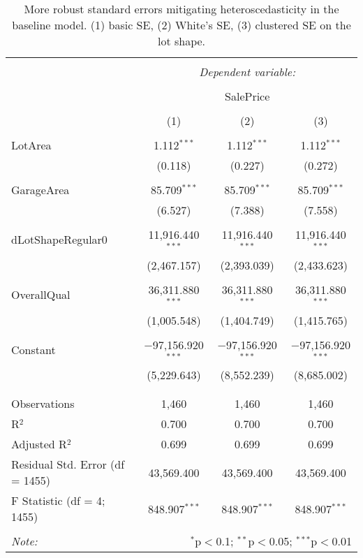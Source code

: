 \documentclass{article}
\begin{document}
\begin{table}[h]
\centering
\caption{\label{tab:standarderrors} More robust standard errors mitigating heteroscedasticity in the baseline model. (1) basic SE, (2) White's SE, (3) clustered SE on the lot shape.}
\begin{tabular}{@{\extracolsep{5pt}}lccc} 
\\[-1.8ex]\hline 
\hline \\[-1.8ex] 
 & \multicolumn{3}{c}{\textit{Dependent variable:}} \\ 
\cline{2-4} 
\\[-1.8ex] & \multicolumn{3}{c}{SalePrice} \\ 
\\[-1.8ex] & (1) & (2) & (3)\\ 
\hline \\[-1.8ex] 
 LotArea & 1.112$^{***}$ & 1.112$^{***}$ & 1.112$^{***}$ \\ 
  & (0.118) & (0.227) & (0.272) \\ 
  & & & \\ 
 GarageArea & 85.709$^{***}$ & 85.709$^{***}$ & 85.709$^{***}$ \\ 
  & (6.527) & (7.388) & (7.558) \\ 
  & & & \\ 
 dLotShapeRegular0 & 11,916.440$^{***}$ & 11,916.440$^{***}$ & 11,916.440$^{***}$ \\ 
  & (2,467.157) & (2,393.039) & (2,433.623) \\ 
  & & & \\ 
 OverallQual & 36,311.880$^{***}$ & 36,311.880$^{***}$ & 36,311.880$^{***}$ \\ 
  & (1,005.548) & (1,404.749) & (1,415.765) \\ 
  & & & \\ 
 Constant & $-$97,156.920$^{***}$ & $-$97,156.920$^{***}$ & $-$97,156.920$^{***}$ \\ 
  & (5,229.643) & (8,552.239) & (8,685.002) \\ 
  & & & \\ 
\hline \\[-1.8ex] 
Observations & 1,460 & 1,460 & 1,460 \\ 
R$^{2}$ & 0.700 & 0.700 & 0.700 \\ 
Adjusted R$^{2}$ & 0.699 & 0.699 & 0.699 \\ 
Residual Std. Error (df = 1455) & 43,569.400 & 43,569.400 & 43,569.400 \\ 
F Statistic (df = 4; 1455) & 848.907$^{***}$ & 848.907$^{***}$ & 848.907$^{***}$ \\ 
\hline 
\hline \\[-1.8ex] 
\textit{Note:}  & \multicolumn{3}{r}{$^{*}$p$<$0.1; $^{**}$p$<$0.05; $^{***}$p$<$0.01} \\ 
\end{tabular} 
\end{table} 
\end{document}
